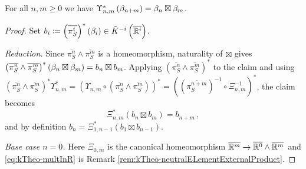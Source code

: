\begin{lemma}\label{lem:ktheo-bottGeneratorsAreMultiplicative}
    For all $n,m\geq 0$ we have
    $\Upsilon_{n,m}^{*}\left(\beta_{n+m}\right)=\beta_n\boxtimes \beta_m$.
\end{lemma}
\begin{proof}
	Set $b_i\coloneq \left(\overline{\pi_S^{i}}\right)^{*}(\beta_i)\in\tilde{K}^{-i}\left(\overline{\mathbb{R}^{i}}\right)$.

	\emph{Reduction.} Since $\overline{\pi_S^{n}}\wedge\overline{\pi_S^{m}}$ is a
	homeomorphism, naturality of $\boxtimes$ gives
	$\left(\overline{\pi_S^{n}}\wedge\overline{\pi_S^{m}}\right)^{*}
	\left(\beta_n\boxtimes\beta_m\right)=b_n\boxtimes b_m$. Applying
	$\left(\overline{\pi_S^{n}}\wedge\overline{\pi_S^{m}}\right)^{*}$ to the claim and
	using $\left(\overline{\pi_S^{n}}\wedge\overline{\pi_S^{m}}\right)^{*}\Upsilon_{n,m}^{*}
	=\left(\Upsilon_{n,m}\circ\left(\overline{\pi_S^{n}}\wedge\overline{\pi_S^{m}}\right)\right)^{*}
	=\left(\left(\overline{\pi_S^{n+m}}\right)^{-1}\circ\Xi_{n,m}^{-1}\right)^{*}$, the
	claim becomes
	\begin{equation}\label{eq:kTheo-multInR}
		\Xi_{n,m}^{*}\left(b_n\boxtimes b_m\right)=b_{n+m}\,,
	\end{equation}
	and by definition $b_n=\Xi_{1,n-1}^{*}\left(b_1\boxtimes b_{n-1}\right)$.

	\emph{Base case $n=0$.} Here $\Xi_{0,m}$ is the canonical homeomorphism
	$\overline{\mathbb{R}^{m}}\to\overline{\mathbb{R}^{0}}\wedge\overline{\mathbb{R}^{m}}$ and
	\eqref{eq:kTheo-multInR} is Remark
	\ref{rem:kTheo-neutralELementExternalProduct}.


\end{proof}
